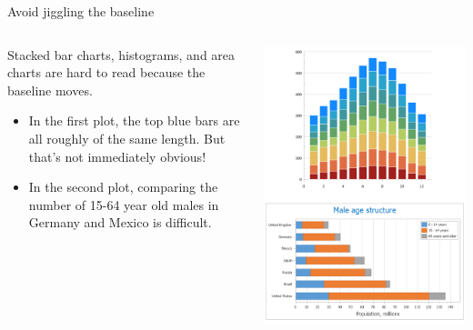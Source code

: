 \documentclass[aspectratio=169]{../latex_main/tntbeamer}  %
\begin{document}
	
	\begin{frame}{Avoid jiggling the baseline}
	
	    \begin{columns}
	        \begin{column}{.5\textwidth}
	                Stacked bar charts, histograms, and area charts are hard to read because the baseline moves. 
	                \begin{itemize}
	                    \item In the first plot, the top blue bars are all roughly of the same length. But that’s not immediately obvious!
	                    \item In the second plot, comparing the number of 15-64 year old males in Germany and Mexico is difficult.
	                \end{itemize}
	        \end{column}
	        
	        
	        \begin{column}{.5\textwidth}

                        \vspace{-2.5em}
	                    \centering
	                    \includegraphics[scale=.35]{Bild78}

	        \end{column}
	    \end{columns}
	\end{frame}
	
\end{document}
